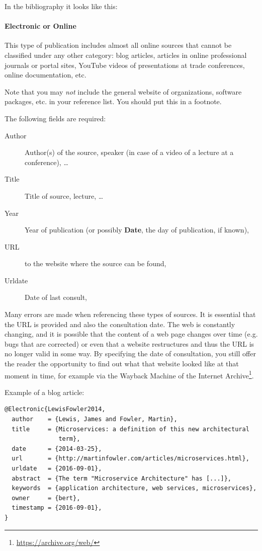 In the bibliography it looks like this: 


\paragraph{Electronic or Online}

This type of publication includes almost all online sources that cannot be classified under any other category: blog articles, articles in online professional journals or portal sites, YouTube videos of presentations at trade conferences, online documentation, etc.

Note that you may \emph{not} include the general website of organizations, software packages, etc. in your reference list. You should put this in a footnote.

The following fields are required:

\begin{description}
  \item[Author] Author(s) of the source, speaker (in case of a video of a lecture at a conference), \ldots
  \item[Title] Title of source, lecture, \ldots
  \item[Year] Year of publication (or possibly \textbf{Date}, the day of publication, if known),
  \item[URL] to the website where the source can be found,
  \item[Urldate] Date of last consult,
\end{description}

Many errors are made when referencing these types of sources. It is essential that the URL is provided and also the consultation date. The web is constantly changing, and it is possible that the content of a web page changes over time (e.g. bugs that are corrected) or even that a website restructures and thus the URL is no longer valid in some way. By specifying the date of consultation, you still offer the reader the opportunity to find out what that website looked like at that moment in time, for example via the Wayback Machine of the Internet Archive\footnote{\url{https://archive.org/web/}}.

Example of a blog article:

\begin{verbatim}
@Electronic{LewisFowler2014,
  author    = {Lewis, James and Fowler, Martin},
  title     = {Microservices: a definition of this new architectural
               term},
  date      = {2014-03-25},
  url       = {http://martinfowler.com/articles/microservices.html},
  urldate   = {2016-09-01},
  abstract  = {The term "Microservice Architecture" has [...]},
  keywords  = {application architecture, web services, microservices},
  owner     = {bert},
  timestamp = {2016-09-01},
}
\end{verbatim}

